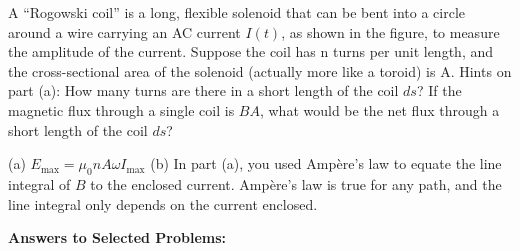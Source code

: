 \begin{Exercise}
A ``Rogowski coil'' is a long, flexible solenoid that can be bent into a circle around a wire carrying an AC current $I(t)$, as shown in the figure, to measure the amplitude of the current.  
Suppose the coil has n turns per unit length, and the cross-sectional area of the solenoid (actually more like a toroid) is A.
Hints on part (a): How many turns are there in a short length of the coil $ds$? If the magnetic flux through a single coil is $BA$, what would be the net flux through a short length of the coil $ds$?
\end{Exercise}
\begin{Answer}
(a) $E_\text{max}=\mu_0 nA\omega I_\text{max}$ (b) In part (a), you used Amp\`ere's law to equate the line integral of $B$ to the enclosed current.  Amp\`ere's law is true for any path, and the line integral only depends on the current enclosed.
\end{Answer}


\vspace{0.7in}

\textbf{Answers to Selected {\thesubsection} Problems:}
\label{induction_prob_answers}
\shipoutAnswer

\cleardoublepage
